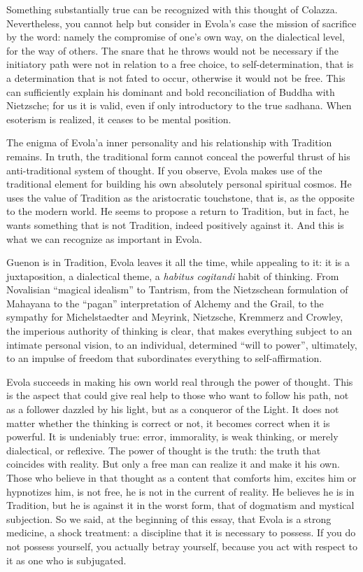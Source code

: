 Something substantially true can be recognized with this thought of Colazza. Nevertheless, you cannot help but consider in Evola's case the mission of sacrifice by the word: namely the compromise of one's own way, on the dialectical level, for the way of others. The snare that he throws would not be necessary if the initiatory path were not in relation to a free choice, to self-determination, that is a determination that is not fated to occur, otherwise it would not be free. This can sufficiently explain his dominant and bold reconciliation of Buddha with Nietzsche; for us it is valid, even if only introductory to the true sadhana. When esoterism is realized, it ceases to be mental position.

The enigma of Evola'a inner personality and his relationship with Tradition remains. In truth, the traditional form cannot conceal the powerful thrust of his anti-traditional system of thought. If you observe, Evola makes use of the traditional element for building his own absolutely personal spiritual cosmos. He uses the value of Tradition as the aristocratic touchstone, that is, as the opposite to the modern world. He seems to propose a return to Tradition, but in fact, he wants something that is not Tradition, indeed positively against it. And this is what we can recognize as important in Evola.

Guenon is in Tradition, Evola leaves it all the time, while appealing to it: it is a juxtaposition, a dialectical theme, a \emph{habitus cogitandi} habit of thinking. From Novalisian ``magical idealism'' to Tantrism, from the Nietzschean formulation of Mahayana to the ``pagan'' interpretation of Alchemy and the Grail, to the sympathy for Michelstaedter and Meyrink, Nietzsche, Kremmerz and Crowley, the imperious authority of thinking is clear, that makes everything subject to an intimate personal vision, to an individual, determined ``will to power'', ultimately, to an impulse of freedom that subordinates everything to self-affirmation.

Evola succeeds in making his own world real through the power of thought. This is the aspect that could give real help to those who want to follow his path, not as a follower dazzled by his light, but as a conqueror of the Light. It does not matter whether the thinking is correct or not, it becomes correct when it is powerful. It is undeniably true: error, immorality, is weak thinking, or merely dialectical, or reflexive. The power of thought is the truth: the truth that coincides with reality. But only a free man can realize it and make it his own. Those who believe in that thought as a content that comforts him, excites him or hypnotizes him, is not free, he is not in the current of reality. He believes he is in Tradition, but he is against it in the worst form, that of dogmatism and mystical subjection. So we said, at the beginning of this essay, that Evola is a strong medicine, a shock treatment: a discipline that it is necessary to possess. If you do not possess yourself, you actually betray yourself, because you act with respect to it as one who is subjugated.

